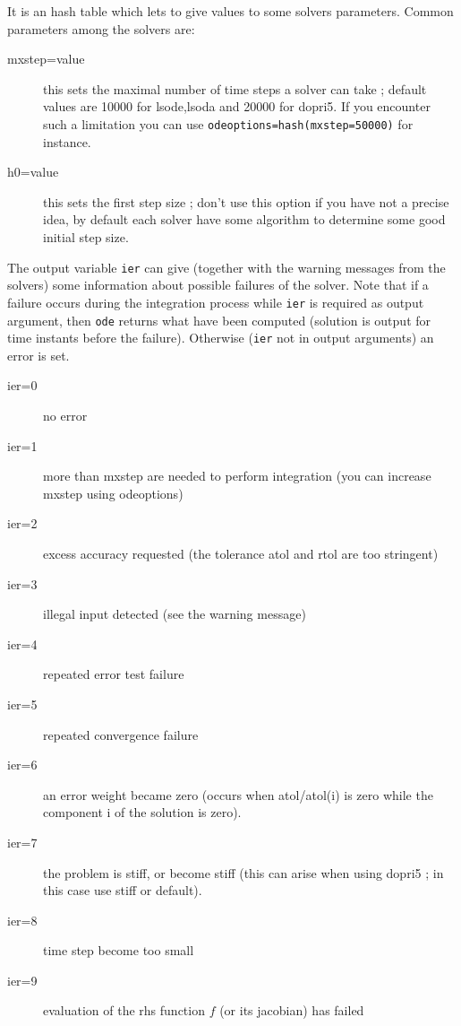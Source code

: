 \begin{mandescription}
 It is an hash table which lets to give values to some solvers parameters. 
Common parameters among the solvers are:
\begin{description}
\item[mxstep=value] this sets the maximal number of time steps a solver can take ; default
values are 10000 for lsode,lsoda and 20000 for dopri5. If you encounter such a limitation
you can use \verb+odeoptions=hash(mxstep=50000)+ for instance.
\item[h0=value] this sets the first step size ; don't use this option if you have not a precise
idea, by default each solver have some algorithm to determine some good initial step size.
\end{description}


The output variable {\tt ier} can give (together with the warning messages from
the solvers) some information about possible failures of the solver. Note that
if a failure occurs during the integration process while {\tt ier} is required
as output argument, then {\tt ode} returns what have been computed (solution
is output for time instants before the failure). Otherwise ({\tt ier} not in
output arguments) an error is set. 
\begin{description}
\item[ier=0] no error
\item[ier=1] more than mxstep are needed to perform integration (you can increase
             mxstep using odeoptions)
\item[ier=2] excess accuracy requested (the tolerance atol and rtol are too stringent)
\item[ier=3] illegal input detected (see the warning message)
\item[ier=4] repeated error test failure
\item[ier=5] repeated convergence failure
\item[ier=6] an error weight became zero (occurs when atol/atol(i) is zero while
             the component i of the solution is zero).
\item[ier=7] the problem is stiff, or become stiff (this can arise when using dopri5 ;
             in this case use stiff or default).
\item[ier=8] time step become too small
\item[ier=9] evaluation of the rhs function $f$ (or its jacobian) has failed
\end{description}


  

\end{mandescription} 

